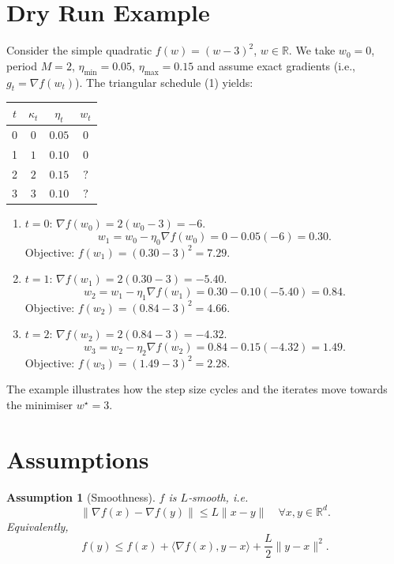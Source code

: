 \documentclass{article}
\newtheorem{assumption}{Assumption}
\begin{document}
\section*{Dry Run Example}
Consider the simple quadratic $f(w)=(w-3)^{2}$, $w\in\mathbb{R}$.  
We take $w_{0}=0$, period $M=2$, $\eta_{\min}=0.05$, $\eta_{\max}=0.15$ and
assume exact gradients (i.e., $g_{t}=\nabla f(w_{t})$).  
The triangular schedule (1) yields:

\begin{center}
\begin{tabular}{c|c|c|c}
$t$ & $\kappa_{t}$ & $\eta_{t}$ & $w_{t}$ \\ \hline
0 & $0$ & $0.05$ & $0$ \\
1 & $1$ & $0.10$ & $0$ \\
2 & $2$ & $0.15$ & $?$ \\
3 & $3$ & $0.10$ & $?$ \\
\end{tabular}
\end{center}

\begin{enumerate}[label={\bf Step \arabic*:}, leftmargin=*, nosep]
\item $t=0$: $\nabla f(w_{0})=2(w_{0}-3)=-6$.
   \[
   w_{1}=w_{0}-\eta_{0}\nabla f(w_{0})=0-0.05(-6)=0.30.
   \]
   Objective: $f(w_{1})=(0.30-3)^{2}=7.29$.
\item $t=1$: $\nabla f(w_{1})=2(0.30-3)=-5.40$.
   \[
   w_{2}=w_{1}-\eta_{1}\nabla f(w_{1})=0.30-0.10(-5.40)=0.84.
   \]
   Objective: $f(w_{2})=(0.84-3)^{2}=4.66$.
\item $t=2$: $\nabla f(w_{2})=2(0.84-3)=-4.32$.
   \[
   w_{3}=w_{2}-\eta_{2}\nabla f(w_{2})=0.84-0.15(-4.32)=1.49.
   \]
   Objective: $f(w_{3})=(1.49-3)^{2}=2.28$.
\end{enumerate}
The example illustrates how the step size cycles and the iterates move
towards the minimiser $w^{\star}=3$.

\newpage
\section*{Assumptions}
\begin{assumption}[Smoothness]\label{ass:smooth}
$f$ is $L$‑smooth, i.e.
\[
\|\nabla f(x)-\nabla f(y)\|\le L\|x-y\|\quad\forall x,y\in\mathbb{R}^{d}.
\tag{A1}
\]
Equivalently,
\[
f(y)\le f(x)+\langle\nabla f(x),y-x\rangle+\frac{L}{2}\|y-x\|^{2}.
\tag{A1'}
\]
\end{assumption}
\end{document}
